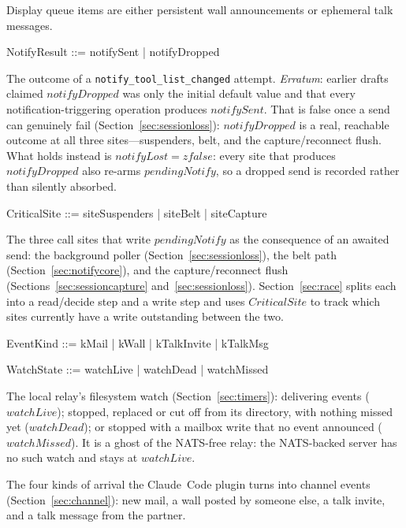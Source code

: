\documentclass[a4paper,10pt,fleqn]{article}
\begin{document}
Display queue items are either persistent wall announcements or
ephemeral talk messages.

\begin{zed}
  NotifyResult ::= notifySent | notifyDropped
\end{zed}

The outcome of a \texttt{notify\_tool\_list\_changed} attempt.
\emph{Erratum}: earlier drafts claimed $notifyDropped$ was only the
initial default value and that every notification-triggering operation
produces $notifySent$.  That is false once a send can genuinely fail
(Section~\ref{sec:sessionloss}): $notifyDropped$ is a real, reachable
outcome at all three sites---suspenders, belt, and the capture/reconnect
flush.  What holds instead is $notifyLost = zfalse$: every site that
produces $notifyDropped$ also re-arms $pendingNotify$, so a dropped send
is recorded rather than silently absorbed.

\begin{zed}
  CriticalSite ::= siteSuspenders | siteBelt | siteCapture
\end{zed}

The three call sites that write $pendingNotify$ as the consequence of an
awaited send: the background poller (Section~\ref{sec:sessionloss}), the
belt path (Section~\ref{sec:notifycore}), and the capture/reconnect flush
(Sections~\ref{sec:sessioncapture} and~\ref{sec:sessionloss}).
Section~\ref{sec:race} splits each into a read/decide step and a
write step and uses $CriticalSite$ to track which sites currently have
a write outstanding between the two.

\begin{zed}
  EventKind ::= kMail | kWall | kTalkInvite | kTalkMsg
\end{zed}

\begin{zed}
  WatchState ::= watchLive | watchDead | watchMissed
\end{zed}

The local relay's filesystem watch (Section~\ref{sec:timers}): delivering
events ($watchLive$); stopped, replaced or cut off from its directory, with
nothing missed yet ($watchDead$); or stopped with a mailbox write that no
event announced ($watchMissed$).  It is a ghost of the NATS-free relay: the
NATS-backed server has no such watch and stays at $watchLive$.

The four kinds of arrival the Claude~Code plugin turns into channel
events (Section~\ref{sec:channel}): new mail, a wall posted by someone
else, a talk invite, and a talk message from the partner.
\end{document}
